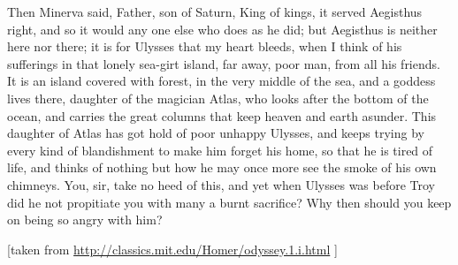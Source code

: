     Then Minerva said, Father, son of Saturn, King of kings, it served Aegisthus right, and so it would any one else who does as he did; but Aegisthus is neither here nor there; it is for Ulysses that my heart bleeds, when I think of his sufferings in that lonely sea-girt island, far away, poor man, from all his friends. It is an island covered with forest, in the very middle of the sea, and a goddess lives there, daughter of the magician Atlas, who looks after the bottom of the ocean, and carries the great columns that keep heaven and earth asunder. This daughter of Atlas has got hold of poor unhappy Ulysses, and keeps trying by every kind of blandishment to make him forget his home, so that he is tired of life, and thinks of nothing but how he may once more see the smoke of his own chimneys. You, sir, take no heed of this, and yet when Ulysses was before Troy did he not propitiate you with many a burnt sacrifice? Why then should you keep on being so angry with him?

    [taken from \url{http://classics.mit.edu/Homer/odyssey.1.i.html} ]
